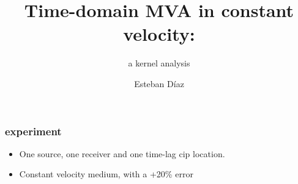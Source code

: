 



\title[]{Time-domain MVA in constant velocity:}
\subtitle{a kernel analysis}
\author[]{Esteban  D\'{i}az}
\date{}
\logo{}

\def\big#1{\begin{center} \LARGE \textbf{#1} \end{center}}
\def\cen#1{\begin{center}        \textbf{#1} \end{center}}

 { \cwpcover }

\begin{frame}

\end{frame}


\begin{frame} \frametitle{experiment}
\begin{itemize}

\item One source, one receiver and one time-lag cip location.
\item Constant velocity medium, with a +20\% error
\end{itemize}
\end{frame}


\begin{frame}\end{frame}

